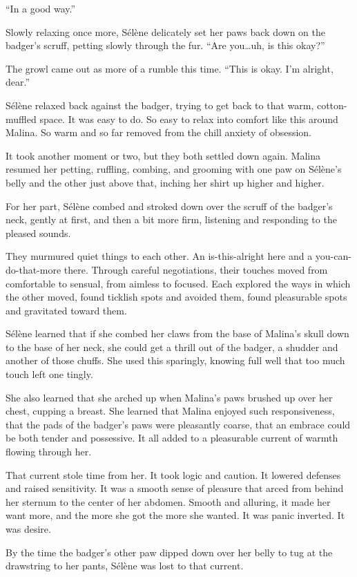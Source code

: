 ``In a good way.''

Slowly relaxing once more, Sélène delicately set her paws back down on the badger's scruff, petting slowly through the fur. ``Are you\ldots{}uh, is this okay?''

The growl came out as more of a rumble this time. ``This is okay. I'm alright, dear.''

Sélène relaxed back against the badger, trying to get back to that warm, cotton-muffled space. It was easy to do. So easy to relax into comfort like this around Malina. So warm and so far removed from the chill anxiety of obsession.

It took another moment or two, but they both settled down again. Malina resumed her petting, ruffling, combing, and grooming with one paw on Sélène's belly and the other just above that, inching her shirt up higher and higher.

For her part, Sélène combed and stroked down over the scruff of the badger's neck, gently at first, and then a bit more firm, listening and responding to the pleased sounds.

They murmured quiet things to each other. An is-this-alright here and a you-can-do-that-more there. Through careful negotiations, their touches moved from comfortable to sensual, from aimless to focused. Each explored the ways in which the other moved, found ticklish spots and avoided them, found pleasurable spots and gravitated toward them.

Sélène learned that if she combed her claws from the base of Malina's skull down to the base of her neck, she could get a thrill out of the badger, a shudder and another of those chuffs. She used this sparingly, knowing full well that too much touch left one tingly.

She also learned that she arched up when Malina's paws brushed up over her chest, cupping a breast. She learned that Malina enjoyed such responsiveness, that the pads of the badger's paws were pleasantly coarse, that an embrace could be both tender and possessive. It all added to a pleasurable current of warmth flowing through her.

That current stole time from her. It took logic and caution. It lowered defenses and raised sensitivity. It was a smooth sense of pleasure that arced from behind her sternum to the center of her abdomen. Smooth and alluring, it made her want more, and the more she got the more she wanted. It was panic inverted. It was desire.

By the time the badger's other paw dipped down over her belly to tug at the drawstring to her pants, Sélène was lost to that current.

